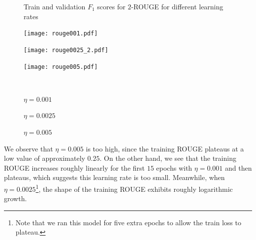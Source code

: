 \documentclass{article} %
\begin{document}
\begin{figure}[!h]
    \centering
    \caption{Train and validation $F_1$ scores for $2$-ROUGE for different learning rates}
    \begin{minipage}[b]{.3\linewidth}
        \centering
        \texttt{[image: rouge001.pdf]}
    \end{minipage}%
    \hfill%
    \begin{minipage}[b]{.3\linewidth}
        \centering
        \texttt{[image: rouge0025\_2.pdf]}
    \end{minipage}%
    \hfill%
    \begin{minipage}[b]{.3\linewidth}
        \centering
        \texttt{[image: rouge005.pdf]}
    \end{minipage}\\[-7pt]
    \begin{minipage}[t]{.3\linewidth}
        \caption{$\eta = 0.001$}\label{fig:awesome_image1}
    \end{minipage}%
    \hfill%
    \begin{minipage}[t]{.3\linewidth}
        \caption{$\eta = 0.0025$}\label{fig:best_rouge}
    \end{minipage}%
    \hfill%
    \begin{minipage}[t]{.3\linewidth}
        \caption{$\eta = 0.005$}\label{fig:awesome_image3}
    \end{minipage}%
\label{fig:tuning}
\end{figure}

We observe that $\eta = 0.005$ is too high, since the training ROUGE plateaus at a low value of approximately $0.25$. 
On the other hand, we see that the training ROUGE increases roughly linearly for the first $15$ epochs with $\eta = 0.001$ and then plateaus, which suggests this learning rate is too small. 
Meanwhile, when $\eta = 0.0025$\footnote{Note that we ran this model for five extra epochs to allow the train loss to plateau.}, the shape of the training ROUGE exhibits roughly logarithmic growth.
\end{document}
